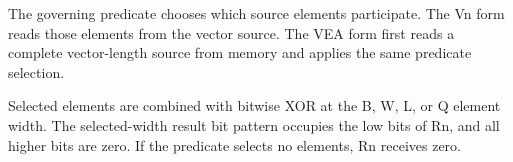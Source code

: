 The governing predicate chooses which source elements participate. The Vn form
reads those elements from the vector source. The VEA form first reads a complete
vector-length source from memory and applies the same predicate selection.

Selected elements are combined with bitwise XOR at the B, W, L, or Q element
width. The selected-width result bit pattern occupies the low bits of Rn, and
all higher bits are zero. If the predicate selects no elements, Rn receives
zero.
